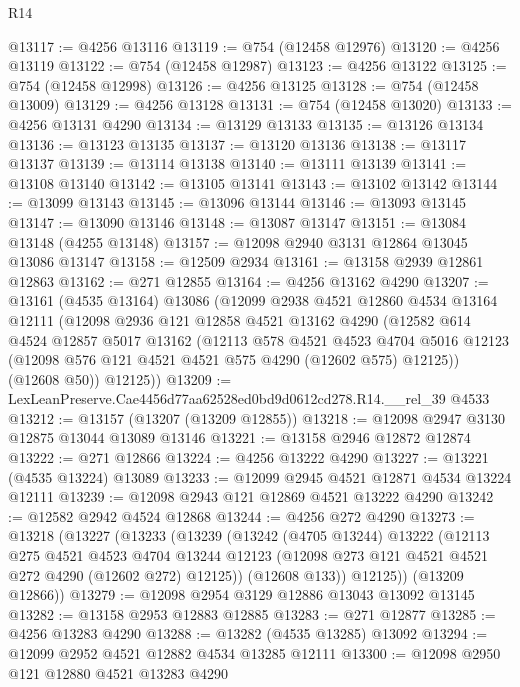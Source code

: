 \begin{lexlean}{R14}
\begin{coremodule}
@13117 := @4256 @13116
@13119 := @754 (@12458 @12976)
@13120 := @4256 @13119
@13122 := @754 (@12458 @12987)
@13123 := @4256 @13122
@13125 := @754 (@12458 @12998)
@13126 := @4256 @13125
@13128 := @754 (@12458 @13009)
@13129 := @4256 @13128
@13131 := @754 (@12458 @13020)
@13133 := @4256 @13131 @4290
@13134 := @13129 @13133
@13135 := @13126 @13134
@13136 := @13123 @13135
@13137 := @13120 @13136
@13138 := @13117 @13137
@13139 := @13114 @13138
@13140 := @13111 @13139
@13141 := @13108 @13140
@13142 := @13105 @13141
@13143 := @13102 @13142
@13144 := @13099 @13143
@13145 := @13096 @13144
@13146 := @13093 @13145
@13147 := @13090 @13146
@13148 := @13087 @13147
@13151 := @13084 @13148 (@4255 @13148)
@13157 := @12098 @2940 @3131 @12864 @13045 @13086 @13147
@13158 := @12509 @2934
@13161 := @13158 @2939 @12861 @12863
@13162 := @271 @12855
@13164 := @4256 @13162 @4290
@13207 := @13161
    (@4535 @13164)
    @13086
    (@12099
      @2938
      @4521
      @12860
      @4534
      @13164
      @12111
      (@12098
        @2936
        @121
        @12858
        @4521
        @13162
        @4290
        (@12582
          @614
          @4524
          @12857
          @5017
          @13162
          (@12113
            @578
            @4521
            @4523
            @4704
            @5016
            @12123
            (@12098 @576 @121 @4521 @4521 @575 @4290 (@12602 @575) @12125))
          (@12608 @50))
        @12125))
@13209 := LexLeanPreserve.Cae4456d77aa62528ed0bd9d0612cd278.R14.__rel_39 @4533
@13212 := @13157 (@13207 (@13209 @12855))
@13218 := @12098 @2947 @3130 @12875 @13044 @13089 @13146
@13221 := @13158 @2946 @12872 @12874
@13222 := @271 @12866
@13224 := @4256 @13222 @4290
@13227 := @13221 (@4535 @13224) @13089
@13233 := @12099 @2945 @4521 @12871 @4534 @13224 @12111
@13239 := @12098 @2943 @121 @12869 @4521 @13222 @4290
@13242 := @12582 @2942 @4524 @12868
@13244 := @4256 @272 @4290
@13273 := @13218
    (@13227
      (@13233
        (@13239
          (@13242
            (@4705 @13244)
            @13222
            (@12113
              @275
              @4521
              @4523
              @4704
              @13244
              @12123
              (@12098 @273 @121 @4521 @4521 @272 @4290 (@12602 @272) @12125))
            (@12608 @133))
          @12125))
      (@13209 @12866))
@13279 := @12098 @2954 @3129 @12886 @13043 @13092 @13145
@13282 := @13158 @2953 @12883 @12885
@13283 := @271 @12877
@13285 := @4256 @13283 @4290
@13288 := @13282 (@4535 @13285) @13092
@13294 := @12099 @2952 @4521 @12882 @4534 @13285 @12111
@13300 := @12098 @2950 @121 @12880 @4521 @13283 @4290

\end{coremodule}
\end{lexlean}
